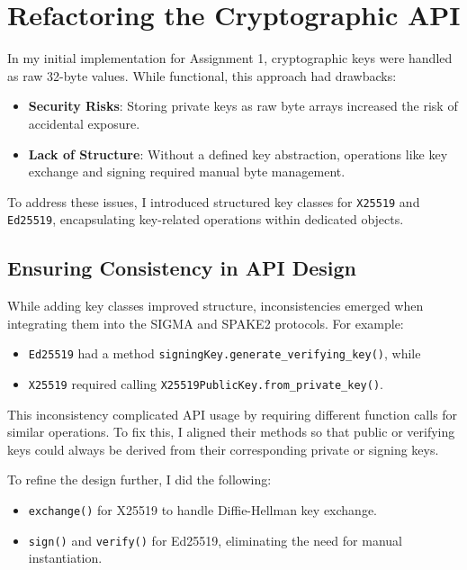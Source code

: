 \documentclass[twoside,a4paper,12pt]{article}
\begin{document}
\section{Refactoring the Cryptographic API}
\label{sec:api_refactoring}

In my initial implementation for Assignment 1, cryptographic keys were handled as raw 32-byte values. While functional, this approach had drawbacks:

\begin{itemize}
    \item \textbf{Security Risks}: Storing private keys as raw byte arrays increased the risk of accidental exposure.
    \item \textbf{Lack of Structure}: Without a defined key abstraction, operations like key exchange and signing required manual byte management.
\end{itemize}

To address these issues, I introduced structured key classes for \texttt{X25519} and \texttt{Ed25519}, encapsulating key-related operations within dedicated objects.

\subsection{Ensuring Consistency in API Design}
\label{subsec:api_consistency}

While adding key classes improved structure, inconsistencies emerged when integrating them into the SIGMA and SPAKE2 protocols. For example:
\begin{itemize}
    \item \texttt{Ed25519} had a method \texttt{signingKey.generate\_verifying\_key()}, while
    \item \texttt{X25519} required calling \texttt{X25519PublicKey.from\_private\_key()}.
\end{itemize}
This inconsistency complicated API usage by requiring different function calls for similar operations. To fix this, I aligned their methods so that public or verifying keys could always be derived from their corresponding private or signing keys.

To refine the design further, I did the following:
\begin{itemize}
    \item \texttt{exchange()} for X25519 to handle Diffie-Hellman key exchange.
    \item \texttt{sign()} and \texttt{verify()} for Ed25519, eliminating the need for manual instantiation.
\end{itemize}
\end{document}
